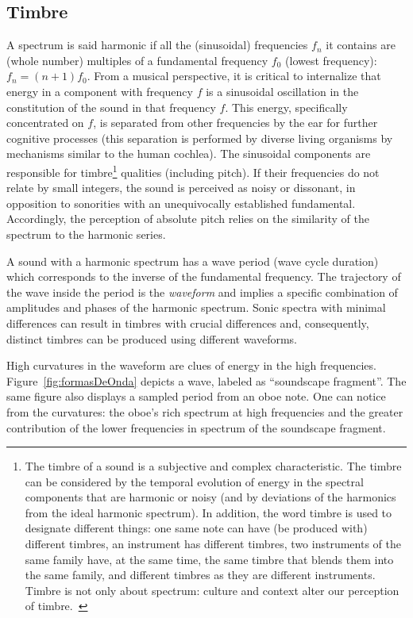 \subsection{Timbre}\label{sec:timbre}
A spectrum is said harmonic if all the (sinusoidal) frequencies $f_n$ it contains are (whole number) multiples of a fundamental frequency $f_0$ (lowest frequency): $f_n=(n+1)f_0$.
From a musical perspective, it is critical to internalize that energy in a component with frequency $f$
is a sinusoidal oscillation in the constitution of the sound in that frequency $f$.
This energy, specifically concentrated on $f$,
is separated from other frequencies by the ear for further cognitive processes 
(this separation is performed by diverse living organisms by mechanisms similar to the human cochlea).
The sinusoidal components are responsible for timbre\footnote{The 
timbre of a sound is a subjective and complex characteristic.
The timbre can be considered by the temporal evolution of energy in the spectral components that 
are harmonic or noisy (and by deviations of the harmonics from the ideal harmonic spectrum).
In addition, the word timbre is used to designate different things:
one same note can have (be produced with) different timbres,
an instrument has different timbres, two instruments of the same family have,
at the same time, the same timbre that blends them into the same family,
and different timbres as they are different instruments.
Timbre is not only about spectrum: culture and context alter our perception of timbre.~\cite{Roederer}} qualities (including pitch).
If their frequencies do not relate by small integers, the sound is perceived as noisy or dissonant,
in opposition to sonorities with an unequivocally established fundamental.
Accordingly, the perception of absolute pitch relies on the similarity of the spectrum to the harmonic series.~\cite{Roederer}

A sound with a harmonic spectrum has a wave period (wave cycle duration) which corresponds to the inverse of the fundamental frequency.
The trajectory of the wave inside the period is the \emph{waveform} and implies a specific combination of amplitudes and phases of the harmonic spectrum.
Sonic spectra with minimal differences can result in timbres with crucial differences and,
consequently, distinct timbres can be produced using different waveforms.

High curvatures in the waveform are clues of energy in the high frequencies.
Figure~\ref{fig:formasDeOnda} depicts a wave, labeled as ``soundscape fragment''.
The same figure also displays a sampled period from an oboe note.
One can notice from the curvatures: the oboe's rich spectrum at high frequencies and the greater contribution of the lower frequencies in spectrum of the soundscape fragment.

